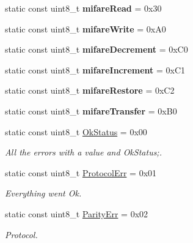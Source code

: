 \begin{DoxyCompactItemize}
static const uint8\+\_\+t {\bfseries mifare\+Read} = 0x30
\item 
\mbox{\label{classMFRC522_a6f995a94e4dfea2658f40fb7f3e6411d}} 
static const uint8\+\_\+t {\bfseries mifare\+Write} = 0x\+A0
\item 
\mbox{\label{classMFRC522_a95810162f58dc2b2eda8053da4cb5dba}} 
static const uint8\+\_\+t {\bfseries mifare\+Decrement} = 0x\+C0
\item 
\mbox{\label{classMFRC522_aaa8dadd82433ee9a49d219c83a3ec7e2}} 
static const uint8\+\_\+t {\bfseries mifare\+Increment} = 0x\+C1
\item 
\mbox{\label{classMFRC522_a760f0c1337aae2febb6e9fa041ccb982}} 
static const uint8\+\_\+t {\bfseries mifare\+Restore} = 0x\+C2
\item 
\mbox{\label{classMFRC522_a83d79879810f8dc2a6bac2120a56b2af}} 
static const uint8\+\_\+t {\bfseries mifare\+Transfer} = 0x\+B0
\item 
static const uint8\+\_\+t \hyperlink{classMFRC522_a571732f99802b33ac2a6695afa1ec7a4}{Ok\+Status} = 0x00
\begin{DoxyCompactList}\small\item\em All the errors with a value and Ok\+Status;. \end{DoxyCompactList}\item 
\mbox{\label{classMFRC522_a6c50a079169f7765026e54b94a6a97a8}} 
static const uint8\+\_\+t \hyperlink{classMFRC522_a6c50a079169f7765026e54b94a6a97a8}{Protocol\+Err} = 0x01
\begin{DoxyCompactList}\small\item\em Everything went Ok. \end{DoxyCompactList}\item 
\mbox{\label{classMFRC522_a6e6c56ee1d07e961a1dea963fea4df99}} 
static const uint8\+\_\+t \hyperlink{classMFRC522_a6e6c56ee1d07e961a1dea963fea4df99}{Parity\+Err} = 0x02
\begin{DoxyCompactList}\small\item\em Protocol. \end{DoxyCompactList}\item 
\mbox{\label{classMFRC522_aa711e6b2b73c4f42262678bd7b551a12}} 

\end{DoxyCompactItemize}
